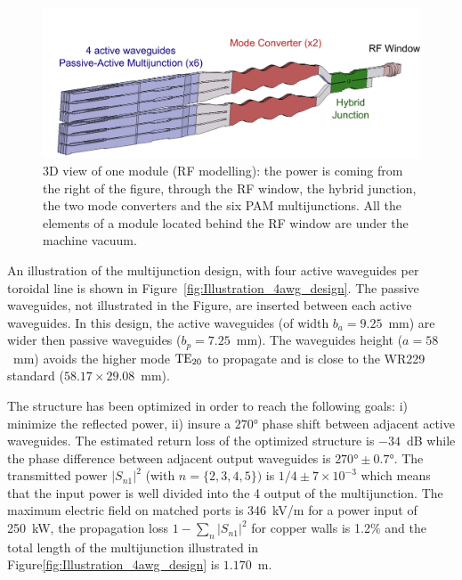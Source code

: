 \begin{figure}
	\includegraphics[width=1.0\textwidth]{figures/chap3/ITER_antenna/LH4ITER_1module}
	\caption{3D view of one module (RF modelling): the power is coming from the
		right of the figure, through the RF window, the hybrid junction, the
		two mode converters and the six PAM multijunctions. All the elements
		of a module located behind the RF window are under the machine vacuum.}
	\label{fig:3D-view_1module}
\end{figure}

An illustration of the multijunction design, with four active waveguides per toroidal line is shown in Figure~\ref{fig:Illustration_4awg_design}. The passive waveguides, not illustrated in the Figure, are inserted between each active waveguides. In this design, the active waveguides (of width $b_{a}=9.25$~mm) are wider then passive waveguides ($b_{p}=7.25$~mm). The waveguides height ($a=58$~mm) avoids the higher mode ${\mathrm{TE}}_{20}$ to propagate and is close to the WR229 standard ($58.17\times29.08$~mm). 

The structure has been optimized in order to reach the following goals: i) minimize the reflected power, ii) insure a $270\si{\degree}$ phase shift between adjacent active waveguides. The estimated return loss of the optimized structure is $-34$~dB while the phase difference between adjacent output waveguides is $270\si{\degree} \pm 0.7\si{\degree}$. The transmitted power $\left|S_{n1}\right|^{2}$ (with $n=\{2,3,4,5\})$ is $1/4\pm7\times10^{-3}$ which means that the input power is well divided into the 4 output of the multijunction. The maximum electric field on matched ports is 346~kV/m for a power input of 250~kW, the propagation loss $1-\sum_{n} \left| S_{n1} \right|^{2}$ for copper walls is 1.2\% and the total length of the multijunction illustrated in Figure\ref{fig:Illustration_4awg_design} is $1.170$~m. 

